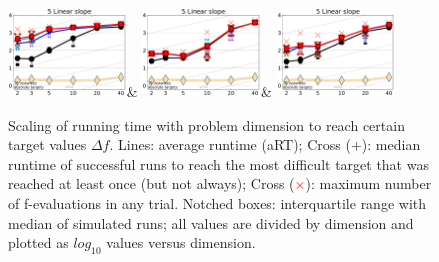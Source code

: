 \documentclass[runningheads]{llncs}
\begin{document}
\begin{figure}[h!tb]
\begin{tabular}
    \includegraphics[width=0.28\textwidth]{GAOnly_f005}&
    \includegraphics[width=0.28\textwidth]{PSOOnly_f005}&
    \includegraphics[width=0.28\textwidth]{GAPSO_f005}\\
    \end{tabular}
    \vspace{-3ex}
     \caption{
 Scaling of running time with problem dimension to reach certain target values $\Delta f$. Lines:
 average runtime (aRT); Cross ($+$): median runtime of successful runs to reach
 the most difficult target that was reached at least once (but not always);
 Cross (\textcolor{red}{$\times$}): maximum number of f-evaluations in any trial. Notched boxes:
 interquartile range with median of simulated runs; all values are divided by
 dimension and plotted as $log_{10}$ values versus dimension. 
}
\label{fig:bbob}
\end{figure}
\end{document}
